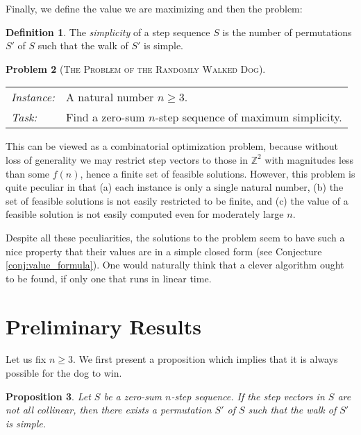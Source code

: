 \documentclass{amsart}
\newtheorem{proposition}{Proposition}[section]
\theoremstyle{definition}
\newtheorem{definition}[proposition]{Definition}
\theoremstyle{problem}
\newtheorem{problem}[proposition]{Problem}
\theoremstyle{remark}
\begin{document}
Finally, we define the value we are maximizing and then the problem:

\begin{definition}
    The \emph{simplicity} of a step sequence $S$
    is the number of permutations $S'$ of $S$
    such that the walk of $S'$ is simple.
\end{definition}

\begin{problem}[\textsc{The Problem of the Randomly Walked Dog}]
\label{prob:rwd}
\begin{framed}
    \begin{tabular}{@{}ll}
        \textit{Instance:} &
        A natural number $n\ge3$. \\

        \textit{Task:}     &
        Find a zero-sum $n$-step sequence of maximum simplicity.
    \end{tabular}
    \vskip -2pt
\end{framed}
\end{problem}

This can be viewed as a combinatorial optimization problem,
because without loss of generality we may restrict step vectors
to those in $\mathbb{Z}^2$ with magnitudes less than some $f(n)$,
hence a finite set of feasible solutions. However, this problem is
quite peculiar in that
(a) each instance is only a single natural number,
(b) the set of feasible solutions is not easily restricted to be finite,
and (c) the value of a feasible solution is not easily computed
even for moderately large $n$.

Despite all these peculiarities, the solutions to the problem seem
to have such a nice property that their values are in
a simple closed form (see Conjecture \ref{conj:value_formula}).
One would naturally think that a clever algorithm ought to be found,
if only one that runs in linear time.

\section{Preliminary Results}

Let us fix $n\ge3$. We first present a proposition which
implies that it is always possible for the dog to win.


\begin{proposition}
    Let $S$ be a zero-sum $n$-step sequence. If the step vectors in $S$ are not all collinear,
    then there exists a permutation $S'$ of $S$ such that the walk of $S'$ is simple.
\end{proposition}
\end{document}
